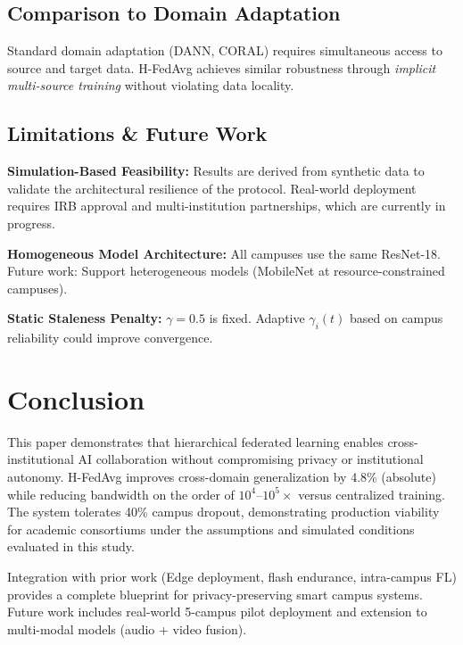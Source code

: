 \documentclass[conference]{IEEEtran}
\begin{document}
\subsection{Comparison to Domain Adaptation}

Standard domain adaptation (DANN, CORAL) requires simultaneous access to source and target data. H-FedAvg achieves similar robustness through \textit{implicit multi-source training} without violating data locality.

\subsection{Limitations \& Future Work}

\textbf{Simulation-Based Feasibility:} Results are derived from synthetic data to validate the architectural resilience of the protocol. Real-world deployment requires IRB approval and multi-institution partnerships, which are currently in progress.

\textbf{Homogeneous Model Architecture:} All campuses use the same ResNet-18. Future work: Support heterogeneous models (MobileNet at resource-constrained campuses).

\textbf{Static Staleness Penalty:} $\gamma = 0.5$ is fixed. Adaptive $\gamma_i(t)$ based on campus reliability could improve convergence.

\section{Conclusion}

This paper demonstrates that hierarchical federated learning enables cross-institutional AI collaboration without compromising privacy or institutional autonomy. H-FedAvg improves cross-domain generalization by 4.8\% (absolute) while reducing bandwidth on the order of $10^4$--$10^5\times$ versus centralized training. The system tolerates 40\% campus dropout, demonstrating production viability for academic consortiums under the assumptions and simulated conditions evaluated in this study.

Integration with prior work (Edge deployment, flash endurance, intra-campus FL) provides a complete blueprint for privacy-preserving smart campus systems. Future work includes real-world 5-campus pilot deployment and extension to multi-modal models (audio + video fusion).
\end{document}
